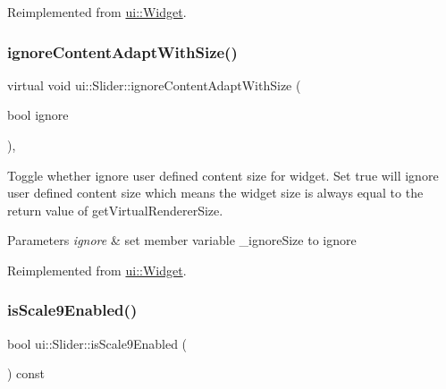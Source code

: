 Reimplemented from \hyperlink{classui_1_1Widget_a47ec556e48f2ac20290c197e30434d36}{ui\+::\+Widget}.

\mbox{\label{classui_1_1Slider_a080562522a4e6fc174fda2cdb6b111af}} 
\subsubsection{\texorpdfstring{ignore\+Content\+Adapt\+With\+Size()}{ignoreContentAdaptWithSize()}\hspace{0.1cm}{\footnotesize\ttfamily [2/2]}}
{\footnotesize\ttfamily virtual void ui\+::\+Slider\+::ignore\+Content\+Adapt\+With\+Size (\begin{DoxyParamCaption}\item[{bool}]{ignore }\end{DoxyParamCaption})\hspace{0.3cm}{\ttfamily [override]}, {\ttfamily [virtual]}}

Toggle whether ignore user defined content size for widget. Set true will ignore user defined content size which means the widget size is always equal to the return value of {\ttfamily get\+Virtual\+Renderer\+Size}.


\begin{DoxyParams}{Parameters}
{\em ignore} & set member variable \+\_\+ignore\+Size to ignore \\
\hline
\end{DoxyParams}


Reimplemented from \hyperlink{classui_1_1Widget_a47ec556e48f2ac20290c197e30434d36}{ui\+::\+Widget}.

\mbox{\label{classui_1_1Slider_ade445792dc967b0556309956621f787a}} 
\subsubsection{\texorpdfstring{is\+Scale9\+Enabled()}{isScale9Enabled()}\hspace{0.1cm}{\footnotesize\ttfamily [1/2]}}
{\footnotesize\ttfamily bool ui\+::\+Slider\+::is\+Scale9\+Enabled (\begin{DoxyParamCaption}{ }\end{DoxyParamCaption}) const}


